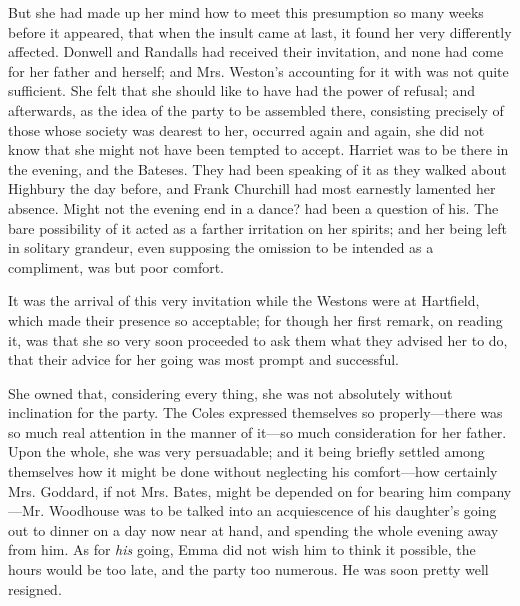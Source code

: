 But she had made up her mind how to meet this presumption so many weeks before it appeared, that when the insult came at last, it found her very differently affected. Donwell and Randalls had received their invitation, and none had come for her father and herself; and Mrs. Weston's accounting for it with  was not quite sufficient. She felt that she should like to have had the power of refusal; and afterwards, as the idea of the party to be assembled there, consisting precisely of those whose society was dearest to her, occurred again and again, she did not know that she might not have been tempted to accept. Harriet was to be there in the evening, and the Bateses. They had been speaking of it as they walked about Highbury the day before, and Frank Churchill had most earnestly lamented her absence. Might not the evening end in a dance? had been a question of his. The bare possibility of it acted as a farther irritation on her spirits; and her being left in solitary grandeur, even supposing the omission to be intended as a compliment, was but poor comfort.

It was the arrival of this very invitation while the Westons were at Hartfield, which made their presence so acceptable; for though her first remark, on reading it, was that  she so very soon proceeded to ask them what they advised her to do, that their advice for her going was most prompt and successful.

She owned that, considering every thing, she was not absolutely without inclination for the party. The Coles expressed themselves so properly---there was so much real attention in the manner of it---so much consideration for her father.  Upon the whole, she was very persuadable; and it being briefly settled among themselves how it might be done without neglecting his comfort---how certainly Mrs. Goddard, if not Mrs. Bates, might be depended on for bearing him company---Mr. Woodhouse was to be talked into an acquiescence of his daughter's going out to dinner on a day now near at hand, and spending the whole evening away from him. As for {\em his} going, Emma did not wish him to think it possible, the hours would be too late, and the party too numerous. He was soon pretty well resigned.

